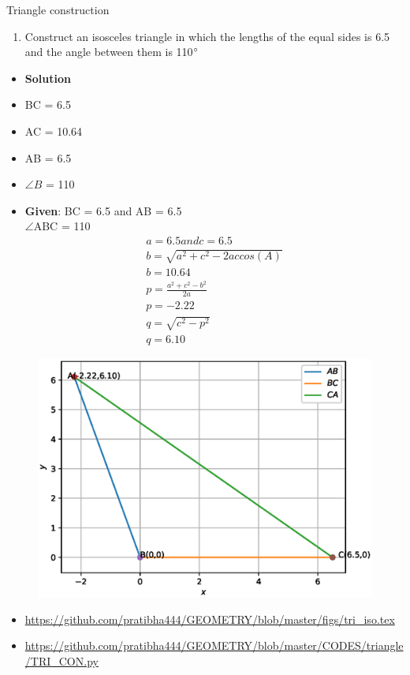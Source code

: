 \begin{frame}{Triangle construction}
\begin{enumerate}
\conti
\item Construct an isosceles triangle in which the lengths of the equal sides is 6.5 and the angle between them is 110$\degree$
\seti
\end{enumerate}
\begin{itemize}
\item\textbf{Solution}\\

\item BC = 6.5 \item AC = 10.64
\item AB = 6.5\\
\item $\angle B$ = 110\\ 
\end{itemize}
\end{frame}
\begin{frame}
\begin{itemize}
\item\textbf{Given}: BC = 6.5 and AB = 6.5\\
$\angle$ABC = 110
\begin{align*}
a = 6.5 and  c = 6.5\\
b = \sqrt{a^2 + c^2 - 2ac cos(A)}\\
b= 10.64\\
p=\frac{a^2 + c^2 - b^2}{2a}\\
p=-2.22\\
q=\sqrt{c^2 - p^ 2}\\
q = 6.10
\end{align*}
\end{itemize}
\end{frame}

\begin{frame}
\begin{figure}
\includegraphics[scale=.4]{./figs/TRI_CON.eps}
\end{figure}
\begin{itemize}
\item \url{https://github.com/pratibha444/GEOMETRY/blob/master/figs/tri_iso.tex}
\item \url{https://github.com/pratibha444/GEOMETRY/blob/master/CODES/triangle/TRI_CON.py}
\end{itemize}
\end{frame}